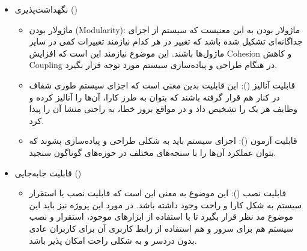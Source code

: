 \begin{itemize}
\item 
نگهداشت‌پذیری ()
\begin{itemize}
	
	\item
	ماژولار بودن (Modularity): ماژولار بودن به این معنیست که سیستم از اجزای جداگانه‌ای تشکیل شده باشد که تغییر در هر کدام نیازمند تغییرات کمی در سایر ماژول‌ها باشند. این موضوع نیازمند این است که افزایش Cohesion و کاهش Coupling در هنگام طراحی و پیاده‌سازی سیستم مورد توجه قرار بگیرد.
	
	\item 
	قابلیت آنالیز (): این قابلیت بدین معنی است که اجزای سیستم طوری شفاف در کنار هم قرار گرفته باشند که بتوان به طرز کارا، آن‌ها را آنالیز کرده و وظایف هر یک را تشخیص داد و در مواقع بروز خطا، به راحتی منشا آن را پیدا کرد.
	
	\item 
	قابلیت آزمون (): اجزای سیستم باید به شکلی طراحی و پیاده‌سازی بشوند که بتوان عملکرد آن‌ها را با سنجه‌های مختلف در حوزه‌های گوناگون سنجید.
	
\end{itemize}


\item
قابلیت جابه‌جایی ()

\begin{itemize}
	\item
	قابلیت نصب ():
	این موضوع به معنی این است که قابلیت نصب یا استقرار سیستم به شکل کارا و راحت وجود داشته باشد. در مورد این پروژه نیز باید این موضوع مد نظر قرار بگیرد تا با استفاده از ابزارهای موجود، استقرار و نصب سیستم هم برای سرور و هم استفاده از رابط کاربری آن برای کاربران عادی بدون دردسر و به شکلی راحت امکان پذیر باشد.
	
\end{itemize}
\end{itemize}